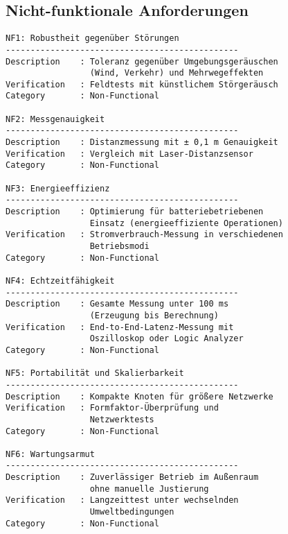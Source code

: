 \subsection{Nicht-funktionale Anforderungen}

\begin{verbatim}
NF1: Robustheit gegenüber Störungen
-----------------------------------------------
Description    : Toleranz gegenüber Umgebungsgeräuschen
                 (Wind, Verkehr) und Mehrwegeffekten
Verification   : Feldtests mit künstlichem Störgeräusch
Category       : Non-Functional

NF2: Messgenauigkeit
-----------------------------------------------
Description    : Distanzmessung mit ± 0,1 m Genauigkeit
Verification   : Vergleich mit Laser-Distanzsensor
Category       : Non-Functional

NF3: Energieeffizienz
-----------------------------------------------
Description    : Optimierung für batteriebetriebenen 
                 Einsatz (energieeffiziente Operationen)
Verification   : Stromverbrauch-Messung in verschiedenen
                 Betriebsmodi
Category       : Non-Functional

NF4: Echtzeitfähigkeit
-----------------------------------------------
Description    : Gesamte Messung unter 100 ms 
                 (Erzeugung bis Berechnung)
Verification   : End-to-End-Latenz-Messung mit 
                 Oszilloskop oder Logic Analyzer
Category       : Non-Functional

NF5: Portabilität und Skalierbarkeit
-----------------------------------------------
Description    : Kompakte Knoten für größere Netzwerke
Verification   : Formfaktor-Überprüfung und 
                 Netzwerktests
Category       : Non-Functional

NF6: Wartungsarmut
-----------------------------------------------
Description    : Zuverlässiger Betrieb im Außenraum 
                 ohne manuelle Justierung
Verification   : Langzeittest unter wechselnden 
                 Umweltbedingungen
Category       : Non-Functional
\end{verbatim}


